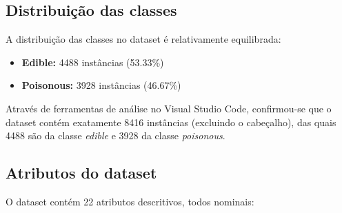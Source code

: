 \documentclass[12pt,a4paper]{article}
\begin{document}
\subsection{Distribuição das classes}

A distribuição das classes no dataset é relativamente equilibrada:

\begin{itemize}
    \item \textbf{Edible:} 4488 instâncias (53.33\%)
    \item \textbf{Poisonous:} 3928 instâncias (46.67\%)
\end{itemize}

Através de ferramentas de análise no Visual Studio Code, confirmou-se que o dataset contém exatamente 8416 instâncias (excluindo o cabeçalho), das quais 4488 são da classe \textit{edible} e 3928 da classe \textit{poisonous}.

\subsection{Atributos do dataset}

O dataset contém 22 atributos descritivos, todos nominais:
\end{document}
